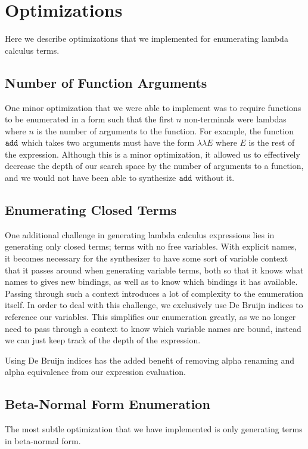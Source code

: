 \section{Optimizations} \label{sec:optimizations}
Here we describe optimizations that we implemented for enumerating lambda
  calculus terms.

\subsection{Number of Function Arguments}
One minor optimization that we were able to implement was to require
  functions to be enumerated in a form such that the first $n$ non-terminals
  were lambdas where $n$ is the number of arguments to the function.
For example, the function $\texttt{add}$ which takes two arguments must have the
  form $\lambda \lambda E$ where $E$ is the rest of the expression.
Although this is a minor optimization, it allowed us to effectively decrease
  the depth of our search space by the number of arguments to a function, and
  we would not have been able to synthesize $\texttt{add}$ without it.

\subsection{Enumerating Closed Terms}
One additional challenge in generating lambda calculus expressions lies in
  generating only closed terms; terms with no free variables.
With explicit names, it becomes necessary for the synthesizer to have some
  sort of variable context that it passes around when generating variable
  terms, both so that it knows what names to gives new bindings, as well as
  to know which bindings it has available.
Passing through such a context introduces a lot of complexity to the
  enumeration itself.
In order to deal with this challenge, we exclusively use De Bruijn indices
  to reference our variables.
This simplifies our enumeration greatly, as we no longer need to pass through
  a context to know which variable names are bound, instead we can just keep
  track of the depth of the expression.

Using De Bruijn indices has the added benefit of removing alpha renaming and
  alpha equivalence from our expression evaluation.

\subsection{Beta-Normal Form Enumeration}
The most subtle optimization that we have implemented is only generating terms
  in beta-normal form.

